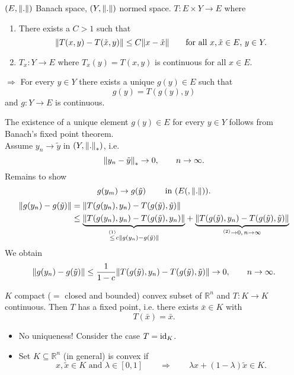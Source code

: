


\begin{theorem}
	$(E,\norm{.})$ Banach space, $(Y,\norm{.})$ normed space. $T: E \times Y \to E$ where
	\begin{enumerate}[(1)]
		\item There exists a $C > 1$ such that
		\[
			\norm{T(x,y)-T(\tilde x,y)} \leq C \norm{x - \tilde x} \qquad \text{for all }x, \tilde x \in E,\, y \in Y.
		\]
		\item $T_x: Y \to E$ where $T_x(y)= T(x,y)$ is continuous for all $x \in E$.
	\end{enumerate}
	$\Rightarrow $ For every $y \in Y$ there exists a unique $g(y) \in E$ such that \[
		g(y)= T(g(y),y)
	\] and $g: Y \to E$ is continuous.
\end{theorem}
\begin{beweis}
	The existence of a unique element $g(y) \in E$ for every $y \in Y$ follows from Banach's fixed point theorem. \\
	Assume $y_n \to \tilde y$ in $(Y, \norm{.}_{*})$, i.e. \[
		\norm{y_n - \tilde y}_* \to 0, \qquad n \to \infty.
	\]
	Remains to show
	\[
		g(y_m) \to g(\tilde y) \qquad \text{ in }(E(,\norm{.})).
	\]
	\begin{align*}
		\norm{g(y_n)- g( \tilde y)} &= \norm{T(g(y_n),y_n) - T(g(\tilde y), \tilde y)} \\
		&\leq  \underset{ \stackrel{(1)}{\leq } c \norm{g(y_n)-g(\tilde y)}}{\underbrace{\norm{T(g(y_n),y_n) - T(g( \tilde y),y_n)}}} + 
		\underset{^{(2)}\to 0, \, n \to \infty}{\underbrace{\norm{T(g(\tilde y),y_n)- T(g(\tilde y),\tilde y)}}}
	\end{align*}
	We obtain
	\[
		\norm{g(y_n)-g(\tilde y)} \leq \frac{1}{1-c} \norm{T(g(\tilde y), y_n) - T(g(\tilde y),\tilde y)} \to 0, \qquad n \to \infty.
	\]
\end{beweis}

\begin{theorem}
	$K$ compact ($=$ closed and bounded) convex subset of $\mathbb{R}^n$ and $T: K \to K$ continuous. Then $T$ has a fixed point, i.e. there exists $\bar{x} \in K$ with
	\[
		T(\bar{x}) = \bar{x}.
	\]
\end{theorem}
\begin{bemerkung}
	\begin{itemize}
		\item No uniqueness! Consider the case $T= \operatorname{id}_K$.
		\item Set $K \subseteq \mathbb{R}^n$ (in general) is convex if
		\[
			x, \tilde x \in K \text{ and } \lambda \in [0,1] \qquad \Rightarrow \qquad \lambda x + ( 1- \lambda)\tilde x \in K.
		\]
	\end{itemize}
\end{bemerkung}

